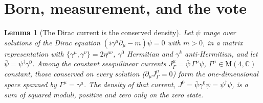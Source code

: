 \documentclass[11pt]{article}
\newtheorem{lemma}[theorem]{Lemma}
\theoremstyle{definition}
\theoremstyle{plain}
\providecommand{\C}{}\renewcommand{\C}{\mathbb{C}}
\providecommand{\Mat}{}\renewcommand{\Mat}{\mathrm{M}}
\begin{document}
\section{Born, measurement, and the vote}

\begin{lemma}[The Dirac current is the conserved density]\label{c:one-relation.dirac-current-conserved-density}
Let $\psi$ range over solutions of the Dirac equation $(i\gamma^{\mu}\partial_{\mu} - m)\psi = 0$ with $m > 0$, in a matrix representation with $\{\gamma^{\mu}, \gamma^{\nu}\} = 2\eta^{\mu\nu}$, $\gamma^{0}$ Hermitian and $\gamma^{k}$ anti-Hermitian, and let $\bar{\psi} = \psi^{\dagger}\gamma^{0}$. Among the constant sesquilinear currents $J^{\mu}_{\Gamma} = \bar{\psi}\,\Gamma^{\mu}\psi$, $\Gamma^{\mu} \in \Mat(4, \C)$ constant, those conserved on every solution ($\partial_{\mu}J^{\mu}_{\Gamma} = 0$) form the one-dimensional space spanned by $\Gamma^{\mu} = \gamma^{\mu}$. The density of that current, $J^{0} = \bar{\psi}\gamma^{0}\psi = \psi^{\dagger}\psi$, is a sum of squared moduli, positive and zero only on the zero state.
\end{lemma}
\end{document}
